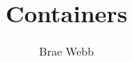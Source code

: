 \documentclass{csse4400}
\title{Containers}
\author{Brae Webb}
\date{\week{3}}
\begin{document}
\makecover






\end{document}
